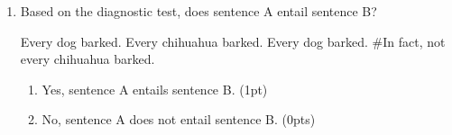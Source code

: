 \documentclass[a4]{article}
\begin{document}
\begin{enumerate}
\item Based on the diagnostic test, does sentence A entail sentence B? 
\begin{exe}
\ex
\begin{xlist}
\ex Every dog barked.
\ex Every chihuahua barked.
\ex Every dog barked. \#In fact, not every chihuahua barked.
\end{xlist}
\begin{enumerate}
    \item Yes, sentence A entails sentence B. (1pt)
    \item No, sentence A does not entail sentence B. (0pts)
\end{enumerate}

\end{exe}




\end{enumerate}
\end{document}
